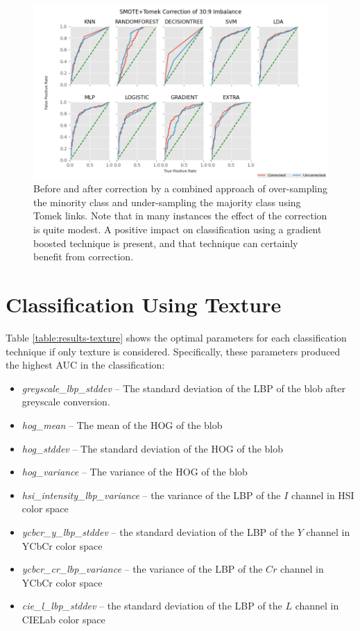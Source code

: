 \documentclass[letterpaper]{report}
\begin{document}
\begin{figure}[h]
	\centering
	\includegraphics[height=0.25\textheight]{figures/roc-corrected-tomek.png}
	\caption[Before and after correction]{Before and after correction by a combined approach of over-sampling the minority class and under-sampling the majority class using Tomek links. Note that in many instances the effect of the correction is quite modest. A positive impact on classification using a gradient boosted technique is present, and that technique can certainly benefit from correction. }
	\label{fig:auc-tomek}
\end{figure}

\section{Classification Using Texture}
Table \ref{table:results-texture} shows the optimal parameters for each classification technique if only texture is considered. Specifically, these parameters produced the highest AUC in the classification:
\begin{itemize}
	\item{\textit{greyscale\_lbp\_stddev} -- The standard deviation of the LBP of the blob after greyscale conversion.}
	\item{\textit{hog\_mean} -- The mean of the HOG of the blob}
	\item{\textit{hog\_stddev} -- The standard deviation of the HOG of the blob}
	\item{\textit{hog\_variance} -- The variance of the HOG of the blob}
	\item{\textit{hsi\_intensity\_lbp\_variance} -- the variance of the LBP of the $I$ channel in HSI color space}
	\item{\textit{ycbcr\_y\_lbp\_stddev} -- the standard deviation of the LBP of the $Y$ channel in YCbCr color space}
	\item{\textit{ycbcr\_cr\_lbp\_variance} -- the variance of the LBP of the $Cr$ channel in YCbCr color space}	
	\item{\textit{cie\_l\_lbp\_stddev} -- the standard deviation of the LBP of the $L$ channel in CIELab color space}
\end{itemize}
\end{document}
